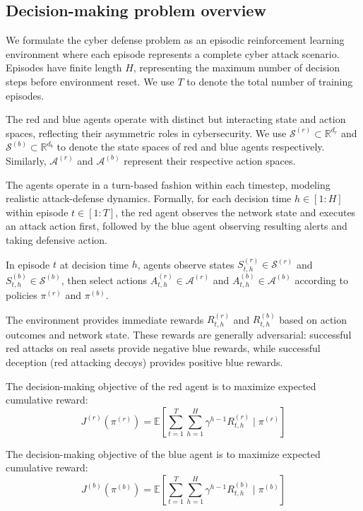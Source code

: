 \documentclass[11pt]{article}
\theoremstyle{definition}
\theoremstyle{plain}
\newcommand{\MC}[1]{\mathcal{#1}}
\newcommand{\EE}{\mathbb{E}}
\begin{document}
\subsection{Decision-making problem overview}

We formulate the cyber defense problem as an episodic reinforcement learning environment where each episode represents a complete cyber attack scenario. Episodes have finite length $H$, representing the maximum number of decision steps before environment reset. We use $T$ to denote the total number of training episodes.

The red and blue agents operate with distinct but interacting state and action spaces, reflecting their asymmetric roles in cybersecurity. We use $\MC{S}^{(r)} \subset \mathbb{R}^{d_r}$ and $\MC{S}^{(b)} \subset \mathbb{R}^{d_b}$ to denote the state spaces of red and blue agents respectively. Similarly, $\MC{A}^{(r)}$ and $\MC{A}^{(b)}$ represent their respective action spaces.

The agents operate in a turn-based fashion within each timestep, modeling realistic attack-defense dynamics. Formally, for each decision time $h \in [1:H]$ within episode $t \in [1:T]$, the red agent observes the network state and executes an attack action first, followed by the blue agent observing resulting alerts and taking defensive action.

In episode $t$ at decision time $h$, agents observe states $S_{t,h}^{(r)} \in \MC{S}^{(r)}$ and $S_{t,h}^{(b)} \in \MC{S}^{(b)}$, then select actions $A_{t,h}^{(r)} \in \MC{A}^{(r)}$ and $A_{t,h}^{(b)} \in \MC{A}^{(b)}$ according to policies $\pi^{(r)}$ and $\pi^{(b)}$.

The environment provides immediate rewards $R_{t,h}^{(r)}$ and $R_{t,h}^{(b)}$ based on action outcomes and network state. These rewards are generally adversarial: successful red attacks on real assets provide negative blue rewards, while successful deception (red attacking decoys) provides positive blue rewards.

The decision-making objective of the red agent is to maximize expected cumulative reward:
\begin{equation}
J^{(r)}(\pi^{(r)}) = \EE\left[\sum_{t=1}^{T} \sum_{h=1}^{H} \gamma^{h-1} R_{t,h}^{(r)} \mid \pi^{(r)}\right]
\end{equation}

The decision-making objective of the blue agent is to maximize expected cumulative reward:
\begin{equation}
J^{(b)}(\pi^{(b)}) = \EE\left[\sum_{t=1}^{T} \sum_{h=1}^{H} \gamma^{h-1} R_{t,h}^{(b)} \mid \pi^{(b)}\right]
\end{equation}
\end{document}
